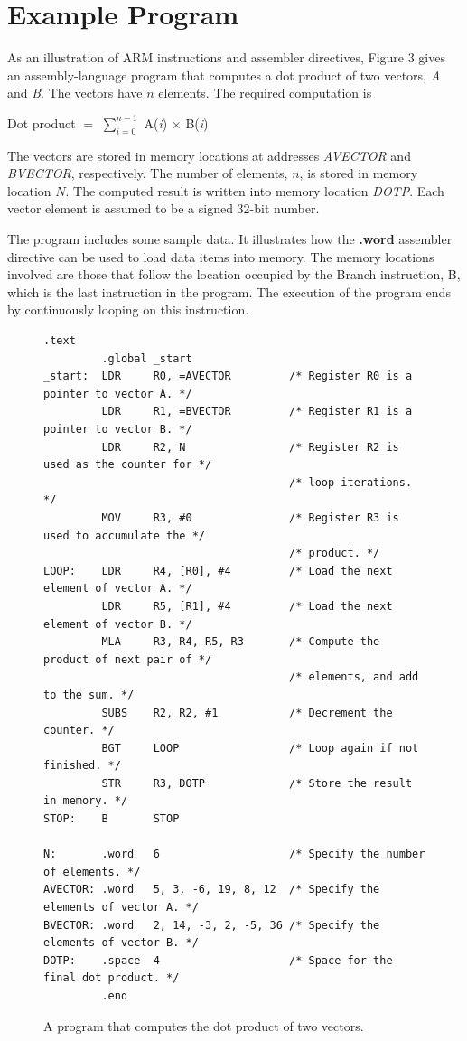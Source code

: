 \documentclass[11pt, twoside, pdftex]{article}
\begin{document}
\section{Example Program}
\label{sec:example}

As an illustration of ARM instructions and assembler directives, 
Figure 3 gives an assembly-language program that computes a dot
product of two vectors, {\it A} and {\it B}. The vectors
have $n$ elements. The required computation is
\begin{center}
Dot product $=$ $\sum_{i = 0}^{n - 1}$ A({\it i}) $\times$ B({\it i})
\end{center}

\noindent
The vectors are stored in memory locations at addresses
{\it AVECTOR} and {\it BVECTOR}, respectively. The number of
elements, $n$, is stored in memory location $N$. The computed result is written
into memory location {\it DOTP}. Each vector element is assumed to be a
signed 32-bit number.

The program includes some sample data. It illustrates how the
{\bf .word} assembler directive can be used to load data items
into memory. The memory locations involved are those
that follow the location occupied by the Branch instruction, B,
which is the last instruction in the program. The execution of
the program ends by continuously looping on this instruction. 

\begin{figure}[H]
\begin{lstlisting}[style=defaultArmStyle]
         .text
         .global _start
_start:  LDR     R0, =AVECTOR         /* Register R0 is a pointer to vector A. */
         LDR     R1, =BVECTOR         /* Register R1 is a pointer to vector B. */
         LDR     R2, N                /* Register R2 is used as the counter for */
                                      /* loop iterations. */
         MOV     R3, #0               /* Register R3 is used to accumulate the */
                                      /* product. */
LOOP:    LDR     R4, [R0], #4         /* Load the next element of vector A. */
         LDR     R5, [R1], #4         /* Load the next element of vector B. */
         MLA     R3, R4, R5, R3       /* Compute the product of next pair of */
                                      /* elements, and add to the sum. */
         SUBS    R2, R2, #1           /* Decrement the counter. */
         BGT     LOOP                 /* Loop again if not finished. */
         STR     R3, DOTP             /* Store the result in memory. */
STOP:    B       STOP

N:       .word   6                    /* Specify the number of elements. */
AVECTOR: .word   5, 3, -6, 19, 8, 12  /* Specify the elements of vector A. */
BVECTOR: .word   2, 14, -3, 2, -5, 36 /* Specify the elements of vector B. */
DOTP:    .space  4                    /* Space for the final dot product. */
         .end
\end{lstlisting}
	\caption{A program that computes the dot product of two vectors.}
	\label{fig:3}
\end{figure}
 
\end{document}
